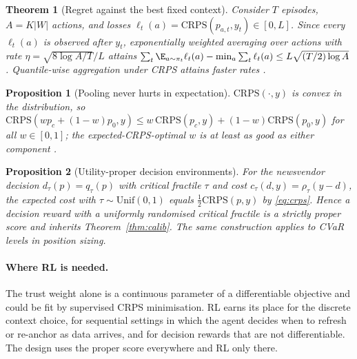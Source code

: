 \documentclass{article}
\newtheorem{theorem}{Theorem}
\newtheorem{proposition}{Proposition}
\newcommand{\crps}{\mathrm{CRPS}}
\begin{document}
\begin{theorem}[Regret against the best fixed context]
\label{thm:regret}
Consider $T$ episodes, $A=K|W|$ actions, and losses $\ell_t(a)=\crps(p_{a,t},y_t)\in[0,L]$. Since every $\ell_t(a)$ is observed after $y_t$, exponentially weighted averaging over actions with rate $\eta=\sqrt{8\log A/T}/L$ attains $\sum_t\E_{a\sim\pi_t}\ell_t(a)-\min_a\sum_t\ell_t(a)\le L\sqrt{(T/2)\log A}$ \citep{cesabianchi2006prediction}. Quantile-wise aggregation under CRPS attains faster rates \citep{berrisch2021crps}.
\end{theorem}

\begin{proposition}[Pooling never hurts in expectation]
\label{prop:pool}
$\crps(\cdot,y)$ is convex in the distribution, so $\crps(w p_c+(1-w)p_0,y)\le w\,\crps(p_c,y)+(1-w)\crps(p_0,y)$ for all $w\in[0,1]$; the expected-CRPS-optimal $w$ is at least as good as either component \citep{ranjan2010combining}.
\end{proposition}

\begin{proposition}[Utility-proper decision environments]
\label{prop:utility}
For the newsvendor decision $d_\tau(p)=q_\tau(p)$ with critical fractile $\tau$ and cost $c_\tau(d,y)=\rho_\tau(y-d)$, the expected cost with $\tau\sim\mathrm{Unif}(0,1)$ equals $\tfrac12\crps(p,y)$ by \eqref{eq:crps}. Hence a decision reward with a uniformly randomised critical fractile is a strictly proper score and inherits Theorem~\ref{thm:calib}. The same construction applies to CVaR levels in position sizing.
\end{proposition}

\paragraph{Where RL is needed.} The trust weight alone is a continuous parameter of a differentiable objective and could be fit by supervised CRPS minimisation. RL earns its place for the discrete context choice, for sequential settings in which the agent decides when to refresh or re-anchor as data arrives, and for decision rewards that are not differentiable. The design uses the proper score everywhere and RL only there.
\end{document}
